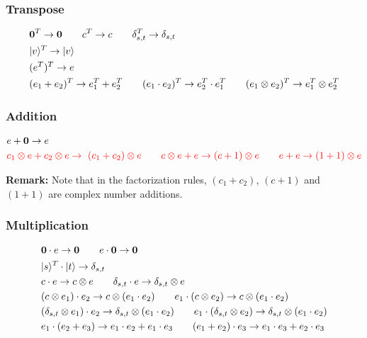 \subsubsection*{Transpose}
\begin{align*}
  & \textbf{0}^T \to \textbf{0}
  \qquad
  c^T \to c
  \qquad 
  \delta_{s,t}^T \to \delta_{s,t} \\
  & |v\rangle^T \to |v\rangle \\
  & (e^T)^T \to e\\
  & (e_1 + e_2)^T \to e_1^T + e_2^T
  \qquad (e_1 \cdot e_2)^T \to e_2^T \cdot e_1^T 
  \qquad (e_1 \otimes e_2)^T \to e_1^T \otimes e_2^T
\end{align*}


\subsubsection*{Addition}
\begin{align*}
  & e + \textbf{0}\to e\\
  & \textcolor{red}{c_1 \otimes e + c_2 \otimes e \to \ (c_1 + c_2) \otimes e 
  \qquad c \otimes e + e \to (c + 1) \otimes e
  \qquad e + e \to (1 + 1) \otimes e}
\end{align*}

\textbf{Remark:} Note that in the factorization rules, $(c_1 + c_2)$, $(c + 1)$ and $(1 + 1)$ are complex number additions.


\subsubsection*{Multiplication}
\begin{align*}
  & \textbf{0} \cdot e \to \textbf{0}
  \qquad 
  e \cdot \textbf{0} \to \textbf{0}\\
  & |s\rangle^T \cdot |t\rangle \to \delta_{s, t}\\
  & c \cdot e \to c \otimes e 
  \qquad \delta_{s, t} \cdot e \to \delta_{s, t} \otimes e\\
  & (c \otimes e_1) \cdot e_2 \to c \otimes (e_1 \cdot e_2)
  \qquad e_1 \cdot (c \otimes e_2) \to c \otimes (e_1 \cdot e_2) \\
  & (\delta_{s, t} \otimes e_1) \cdot e_2 \to \delta_{s, t} \otimes (e_1 \cdot e_2)
  \qquad e_1 \cdot (\delta_{s, t} \otimes e_2) \to \delta_{s, t} \otimes (e_1 \cdot e_2) \\
  & e_1 \cdot (e_2 + e_3) \to e_1 \cdot e_2 + e_1 \cdot e_3
  \qquad (e_1 + e_2) \cdot e_3 \to e_1 \cdot e_3 + e_2 \cdot e_3
\end{align*}

